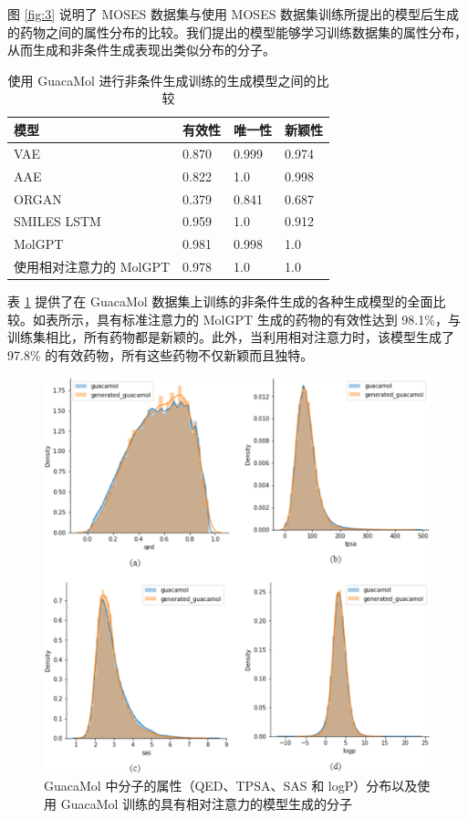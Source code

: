\begin{translation}
图 \ref{fig:3} 说明了 MOSES 数据集与使用 MOSES 数据集训练所提出的模型后生成的药物之间的属性分布的比较。我们提出的模型能够学习训练数据集的属性分布，从而生成和非条件生成表现出类似分布的分子。

\begin{table}[H]
  \centering
  \caption{使用 GuacaMol 进行非条件生成训练的生成模型之间的比较}
  \label{tab:2}
  \begin{tabular}{llll}
    \hline 模型       & 有效性   & 唯一性   & 新颖性   \\
    \hline VAE      & 0.870 & 0.999 & 0.974 \\
    AAE             & 0.822 & 1.0   & 0.998 \\
    ORGAN           & 0.379 & 0.841 & 0.687 \\
    SMILES LSTM     & 0.959 & 1.0   & 0.912 \\
    MolGPT          & 0.981 & 0.998 & 1.0   \\
    使用相对注意力的 MolGPT & 0.978 & 1.0   & 1.0   \\
    \hline
  \end{tabular}
\end{table}

表 \ref{tab:2} 提供了在 GuacaMol 数据集上训练的非条件生成的各种生成模型的全面比较。如表所示，具有标准注意力的 MolGPT 生成的药物的有效性达到 98.1\%，与训练集相比，所有药物都是新颖的。此外，当利用相对注意力时，该模型生成了 97.8\% 的有效药物，所有这些药物不仅新颖而且独特。

\begin{figure}[H]
  \centering
  \includegraphics[width=\linewidth]{figures/4.png}
  \caption{GuacaMol 中分子的属性（QED、TPSA、SAS 和 logP）分布以及使用 GuacaMol 训练的具有相对注意力的模型生成的分子}
  \label{fig:4}
\end{figure}


\end{translation}

